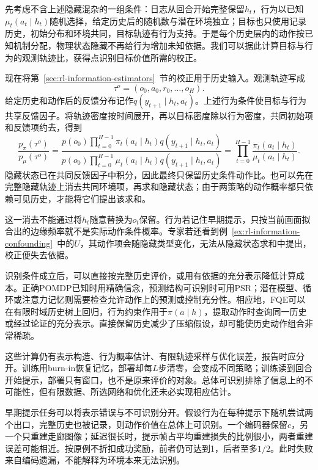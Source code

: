 先考虑不含上述隐藏混杂的一组条件：日志从回合开始完整保留$h_t$，行为以已知$\mu_t(a_t\mid h_t)$随机选择，给定历史后的随机数与潜在环境独立；目标也只使用记录历史，初始分布和环境共同，目标轨迹有行为支持。于是每个历史层内的动作按已知机制分配，物理状态隐藏不再给行为增加未知依据。我们可以据此计算目标与行为的观测轨迹比，获得点识别目标价值所需的校正。

现在将第~\ref{sec:rl-information-estimators}~节的校正用于历史输入。观测轨迹写成
\[
  \tau^o=(o_0,a_0,r_0,\ldots,o_H).
\]
给定历史和动作后的反馈分布记作$q(y_{t+1}\mid h_t,a_t)$。上述行为条件使目标与行为共享反馈因子。将轨迹密度按时间展开，再以目标密度除以行为密度，共同初始项和反馈项约去，得到
\begin{equation}
  \label{eq:rl-information-history-is}
  \frac{p_\pi(\tau^o)}{p_\mu(\tau^o)}
   =\frac{p(o_0)\prod_{t=0}^{H-1}
                  \pi_t(a_t\mid h_t)q(y_{t+1}\mid h_t,a_t)}
          {p(o_0)\prod_{t=0}^{H-1}
                  \mu_t(a_t\mid h_t)q(y_{t+1}\mid h_t,a_t)}
   =\prod_{t=0}^{H-1}\frac{\pi_t(a_t\mid h_t)}
                              {\mu_t(a_t\mid h_t)}.
\end{equation}
隐藏状态已在共同反馈因子中积分，因此最终只保留历史条件动作比。也可以先在完整隐藏轨迹上消去共同环境项，再求和隐藏状态；由于两策略的动作概率都只依赖可见历史，才能将它们提出该求和。

这一消去不能通过将$h_t$随意替换为$o_t$保留。行为若记住早期提示，只按当前画面拟合出的边缘频率就不是实际动作条件概率。专家若还看到例~\ref{ex:rl-information-confounding}~中的$U$，其动作项会随隐藏类型变化，无法从隐藏状态求和中提出，校正便失去依据。

识别条件成立后，可以直接按完整历史评价，或用有依据的充分表示降低计算成本。正确POMDP已知时用精确信念，预测结构可识别时可用PSR；潜在模型、循环或注意力记忆则需要检查允许动作上的预测或控制充分性。相应地，FQE可以在有限时域历史树上回归，行为约束作用于$\pi(a\mid h)$，提取动作时查询同一历史或经过论证的充分表示。直接保留历史减少了压缩假设，却可能使历史动作组合非常稀疏。

这些计算仍有表示构造、行为概率估计、有限轨迹采样与优化误差，报告时应分开。训练用burn-in恢复记忆，部署却每$L$步清零，会变成不同策略；训练读到回合开始提示，部署只有窗口，也不是原来评价的对象。总体可识别排除了信息上的不可能性，但有限数据、所选网络和优化还未必实现相应估计。

早期提示任务可以将表示错误与不可识别分开。假设行为在每种提示下随机尝试两个出口，完整历史也被记录，则动作价值在总体上可识别。一个编码器保留$c$，另一个只重建走廊图像；延迟很长时，提示帧占平均重建损失的比例很小，两者重建误差可能相近。按原例不折扣成功奖励，前者仍可达到1，后者至多$1/2$。此时失败来自编码遗漏，不能解释为环境本来无法识别。

